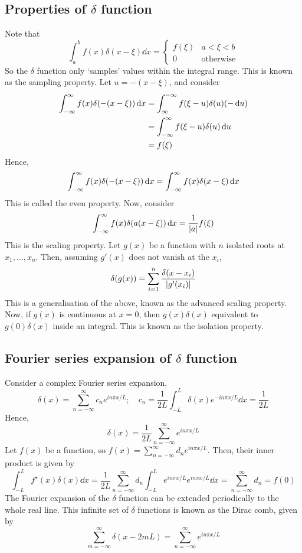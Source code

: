 \subsection{Properties of \texorpdfstring{\( \delta \)}{𝛿} function}
Note that
\[
	\int_a^b f(x) \delta(x-\xi) \dd{x} = \begin{cases}
		f(\xi) & a < \xi < b      \\
		0      & \text{otherwise}
	\end{cases}
\]
So the \( \delta \) function only `samples' values within the integral range.
This is known as the sampling property.
Let \( u = -(x-\xi) \), and consider
\begin{align*}
	\int_{-\infty}^\infty f(x) \delta\qty(-(x-\xi)) \dd{x} & = \int_{\infty}^{-\infty} f(\xi - u) \delta(u) (-\dd{u}) \\
	                                                       & = \int_{-\infty}^\infty f(\xi - u) \delta(u) \dd{u}      \\
	                                                       & = f(\xi)
\end{align*}
Hence,
\[
	\int_{-\infty}^\infty f(x) \delta\qty(-(x-\xi)) \dd{x} = \int_{-\infty}^\infty f(x) \delta(x-\xi) \dd{x}
\]
This is called the even property.
Now, consider
\[
	\int_{-\infty}^\infty f(x) \delta(a(x-\xi)) \dd{x} = \frac{1}{\abs{a}}f(\xi)
\]
This is the scaling property.
Let \( g(x) \) be a function with \( n \) isolated roots at \( x_1, \dots, x_n \).
Then, assuming \( g'(x) \) does not vanish at the \( x_i \),
\[
	\delta(g(x)) = \sum_{i=1}^n \frac{\delta(x - x_i)}{\abs{g'(x_i)}}
\]
This is a generalisation of the above, known as the advanced scaling property.
Now, if \( g(x) \) is continuous at \( x = 0 \), then \( g(x) \delta(x) \) equivalent to \( g(0) \delta(x) \) inside an integral.
This is known as the isolation property.

\subsection{Fourier series expansion of \texorpdfstring{\( \delta \)}{𝛿} function}
Consider a complex Fourier series expansion,
\[
	\delta(x) = \sum_{n=-\infty}^\infty c_n e^{in\pi x/L};\quad c_n = \frac{1}{2L}\int_{-L}^L \delta(x) e^{-i n \pi x / L} \dd{x} = \frac{1}{2L}
\]
Hence,
\[
	\delta(x) = \frac{1}{2L} \sum_{n=-\infty}^\infty e^{in\pi x/L}
\]
Let \( f(x) \) be a function, so \( f(x) = \sum_{n=-\infty}^\infty d_n e^{in \pi x / L} \).
Then, their inner product is given by
\[
	\int_{-L}^L f^\star(x) \delta(x) \dd{x} = \frac{1}{2L} \sum_{n = -\infty}^\infty d_n \int_{-L}^L e^{in \pi x/L} e^{in \pi x/L} \dd{x} = \sum_{n = -\infty}^\infty d_n = f(0)
\]
The Fourier expansion of the \( \delta \) function can be extended periodically to the whole real line.
This infinite set of \( \delta \) functions is known as the Dirac comb, given by
\[
	\sum_{m = -\infty}^\infty \delta(x-2mL) = \sum_{n = -\infty}^\infty e^{in \pi x/L}
\]


